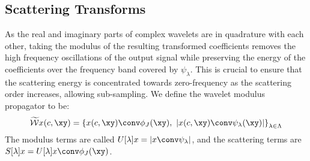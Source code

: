 \subsection{Scattering Transforms}\label{sec:ch5:scatter}
As the real and imaginary parts of complex wavelets are in quadrature with
each other, taking the modulus of the resulting transformed coefficients removes
the high frequency oscillations of the output signal while preserving the energy
of the coefficients over the frequency band covered by $\psi_\lambda$. This is
crucial to ensure that the scattering energy is concentrated towards
zero-frequency as the scattering order increases, allowing sub-sampling.
We define the wavelet modulus propagator to be:
%
\begin{equation}
  \label{eq:ch5:wave_mod}
\widetilde{\mathcal{W}}x(c, \xy) = \left\{ x(c, \xy) \conv \phi_{J}(\xy),\ |x(c, \xy) \conv \psi_\lambda (\xy) | \right\}_{\lambda \in \Lambda} 
\end{equation}
The modulus terms are called $U[\lambda] x = \lvert x \conv \psi_\lambda \rvert$, and the scattering terms
are $S[\lambda] x = U[\lambda]x \conv \phi_J (\xy)$.




